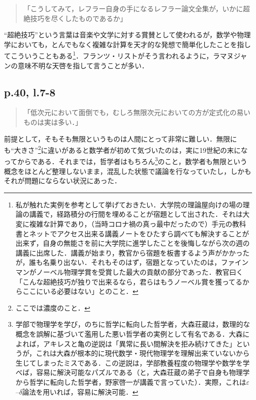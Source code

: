 \documentclass[10pt, a5paper, twoside]{jsarticle}
\theoremstyle{definition}
\begin{document}
                \begin{quote}

                    「こうしてみて，レフラー自身の手になるレフラー論文全集が，いかに超絶技巧を尽くしたものであるか」

                \end{quote}

                “超絶技巧”という言葉は音楽や文学に対する賞賛として使われるが，数学や物理学においても，とんでもなく複雑な計算を天才的な発想で簡単化したことを指してこういうこともある\footnote{私が触れた実例を参考として挙げておきたい．大学院の理論屋向けの場の理論の講義で，経路積分の行間を埋めることが宿題として出された．それは大変に複雑な計算であり，（当時コロナ禍の真っ最中だったので）手元の教科書とネットでアクセス出来る講義ノートをひたすら調べても解決することが出来ず，自身の無能さを前に大学院に進学したことを後悔しながら次の週の講義に出席した．講義が始まり，教官から宿題を板書するよう声がかかったが，誰も名乗り出ない．それもそのはず，宿題となっていたのは，ファインマンがノーベル物理学賞を受賞した最大の貢献の部分であった．教官曰く「こんな超絶技巧が独りで出来るなら，君らはもうノーベル賞を獲ってるからここにいる必要はない」とのこと．}．フランツ・リストがそう言われるように，ラマヌジャンの意味不明な天啓を指して言うことが多い．

            \subsection{p.40, l.7-8}

                \begin{quote}

                    「低次元において面倒でも，むしろ無限次元においての方が定式化の易いものは実は多い．」

                \end{quote}

                前提として，そもそも無限というものは人間にとって非常に難しい．無限にも“大きさ”\footnote{ここでは濃度のこと．}に違いがあると数学者が初めて気づいたのは，実に19世紀の末になってからである．それまでは，哲学者はもちろん\footnote{学部で物理学を学び，のちに哲学に転向した哲学者，大森荘蔵は，数理的な概念を誤解に基づいて濫用した悪い哲学者の実例として有名である．大森によれば，アキレスと亀の逆説は「異常に長い間解決を拒み続けてきた」\cite{omr}というが，これは大森が根本的に現代数学・現代物理学を理解出来ていないから生じてしまったミスである．この逆説は，学部教養程度の物理学や数学を学べば，容易に解決可能なパズルである（と，大森荘蔵の弟子で自身も物理学から哲学に転向した哲学者，野家啓一が講義で言っていた）．実際，これは$\varepsilon$--$\delta$論法を用いれば，容易に解決可能．}のこと，数学者も無限という概念をほとんど整理しないまま，混乱した状態で議論を行なっていたし，しかもそれが問題にならない状況にあった．
\end{document}
